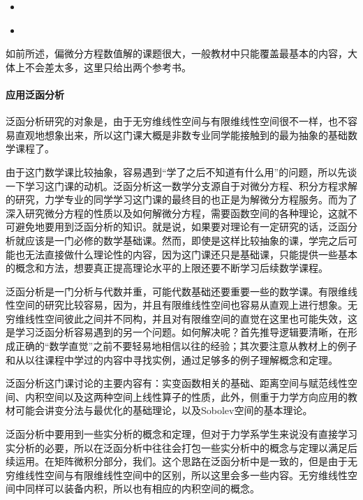 \begin{itemize}
    \item \textcite[微分方程数值解法（第四版）]{李荣华2009}
    \item \textcite[偏微分方程数值解法（第三版）]{陆金甫2016偏微分方程数值解法}
\end{itemize}

如前所述，偏微分方程数值解的课题很大，一般教材中只能覆盖最基本的内容，大体上不会差太多，这里只给出两个参考书。

\paragraph{应用泛函分析}

泛函分析研究的对象是，由于无穷维线性空间与有限维线性空间很不一样，也不容易直观地想象出来，所以这门课大概是非数专业同学能接触到的最为抽象的基础数学课程了。

由于这门数学课比较抽象，容易遇到“学了之后不知道有什么用”的问题，所以先谈一下学习这门课的动机。泛函分析这一数学分支源自于对微分方程、积分方程求解的研究，力学专业的同学学习这门课的最终目的也正是为解微分方程服务。而为了深入研究微分方程的性质以及如何解微分方程，需要函数空间的各种理论，这就不可避免地要用到泛函分析的知识。就是说，如果要对理论有一定研究的话，泛函分析就应该是一门必修的数学基础课。然而，即使是这样比较抽象的课，学完之后可能也无法直接做什么理论性的内容，因为这门课还只是基础课，只能提供一些基本的概念和方法，想要真正提高理论水平的上限还要不断学习后续数学课程。

泛函分析是一门分析与代数并重，可能代数基础还要重要一些的数学课。有限维线性空间的研究比较容易，因为，并且有限维线性空间也容易从直观上进行想象。无穷维线性空间彼此之间并不同构，并且对有限维空间的直觉在这里也可能失效，这是学习泛函分析容易遇到的另一个问题。如何解决呢？首先推导逻辑要清晰，在形成正确的“数学直觉”之前不要轻易地相信以往的经验；其次要注意从教材上的例子和从以往课程中学过的内容中寻找实例，通过足够多的例子理解概念和定理。

泛函分析这门课讨论的主要内容有：实变函数相关的基础、距离空间与赋范线性空间、内积空间以及这两种空间上线性算子的性质，此外，侧重于力学方向应用的教材可能会讲变分法与最优化的基础理论，以及Sobolev空间的基本理论。

泛函分析中要用到一些实分析的概念和定理，但对于力学系学生来说没有直接学习实分析的必要，所以在泛函分析中往往会打包一些实分析中的概念与定理以满足后续运用。在矩阵微积分部分，我们。这个思路在泛函分析中是一致的，但是由于无穷维线性空间与有限维线性空间中的区别，所以这里会多一些内容。无穷维线性空间中同样可以装备内积，所以也有相应的内积空间的概念。

